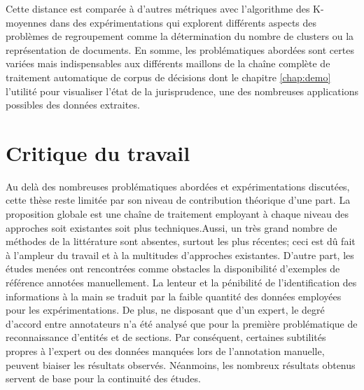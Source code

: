 Cette distance est comparée à d'autres métriques avec l'algorithme des K-moyennes dans des expérimentations qui explorent différents aspects des problèmes de regroupement comme la détermination du nombre de clusters ou la représentation de documents. En somme, les problématiques abordées sont certes variées mais indispensables aux différents maillons de la chaîne complète de traitement automatique de corpus de décisions dont le chapitre \ref{chap:demo} l'utilité pour visualiser l'état de la jurisprudence, une des nombreuses applications possibles des données extraites. 


\section{Critique du travail}
\label{sec:conclusion:critique}
Au delà des nombreuses problématiques abordées et expérimentations discutées, cette thèse reste limitée par son niveau de contribution théorique d'une part. La proposition globale est une chaîne de traitement employant à chaque niveau des approches soit existantes soit plus techniques.Aussi, un très grand nombre de méthodes de la littérature sont absentes, surtout les plus récentes; ceci est dû fait à l'ampleur du travail et à la multitudes d'approches existantes.  D'autre part, les études menées ont rencontrées comme obstacles la disponibilité d'exemples de référence annotées manuellement. La lenteur et la pénibilité de l'identification des informations à la main se traduit par la faible quantité des données employées pour les expérimentations. De plus, ne disposant que d'un expert, le degré d'accord entre annotateurs n'a été analysé que pour la première problématique de reconnaissance d'entités et de sections. Par conséquent, certaines subtilités propres à l'expert ou des données manquées lors de l'annotation manuelle, peuvent biaiser les résultats observés. Néanmoins, les nombreux résultats obtenus servent de base pour la continuité des études. 


